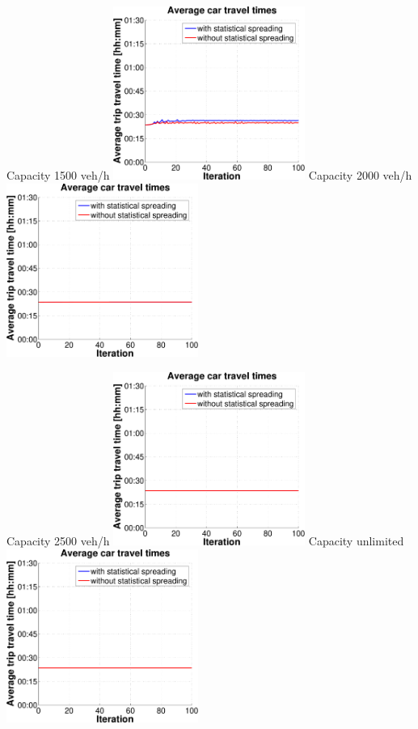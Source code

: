 {  \createsubfigure%
  {Capacity 1500 veh/h}%
  {\includegraphics[width=0.47\textwidth, angle=0, trim=0mm 0mm 0mm 9mm, clip=true]{extending/figures/MultiModalSimulation/simulations/avg_car_traveltime_scatter_1500}}%
  {\label{}}%
  {\hspace{3mm}}%
  \createsubfigure%
  {Capacity 2000 veh/h}%
  {\includegraphics[width=0.47\textwidth, angle=0, trim=0mm 0mm 0mm 9mm, clip=true]{extending/figures/MultiModalSimulation/simulations/avg_car_traveltime_scatter_2000}}%
  {\label{}}%
  {\vspace{7.5mm}}%

  \createsubfigure%
  {Capacity 2500 veh/h}%
  {\includegraphics[width=0.47\textwidth, angle=0, trim=0mm 0mm 0mm 9mm, clip=true]{extending/figures/MultiModalSimulation/simulations/avg_car_traveltime_scatter_2500}}%
  {\label{}}%
  {\hspace{3mm}}%
  \createsubfigure%
  {Capacity unlimited}%
  {\includegraphics[width=0.47\textwidth, angle=0, trim=0mm 0mm 0mm 9mm, clip=true]{extending/figures/MultiModalSimulation/simulations/avg_car_traveltime_scatter_unlimited}}%
  {\label{}}%
  {}%
}%
